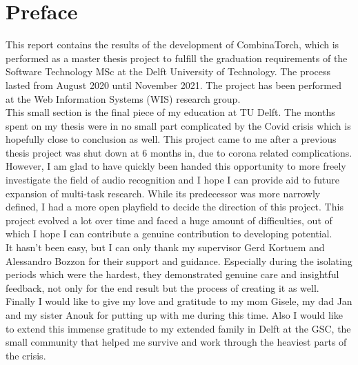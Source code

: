 \chapter*{Preface}


This report contains the results of the development of CombinaTorch, which is performed as a master thesis project to fulfill the graduation requirements of the Software Technology MSc at the Delft University of Technology. The process lasted from August 2020 until November 2021. The project has been performed at the Web Information Systems (WIS) research group.\\

This small section is the final piece of my education at TU Delft. The months spent on my thesis were in no small part complicated by the Covid crisis which is hopefully close to conclusion as well. This project came to me after a previous thesis project was shut down at 6 months in, due to corona related complications. However, I am glad to have quickly been handed this opportunity to more freely investigate the field of audio recognition and I hope I can provide aid to future expansion of multi-task research. While its predecessor was more narrowly defined, I had a more open playfield to decide the direction of this project. This project evolved a lot over time and faced a huge amount of difficulties, out of which I hope I can contribute a genuine contribution to developing potential.\\

It hasn't been easy, but I can only thank my supervisor Gerd Kortuem and Alessandro Bozzon for their support and guidance. Especially during the isolating periods which were the hardest, they demonstrated genuine care and insightful feedback, not only for the end result but the process of creating it as well.\\

Finally I would like to give my love and gratitude to my mom Gisele, my dad Jan and my sister Anouk for putting up with me during this time. Also I would like to extend this immense gratitude to my extended family in Delft at the GSC, the small community that helped me survive and work through the heaviest parts of the crisis.\\